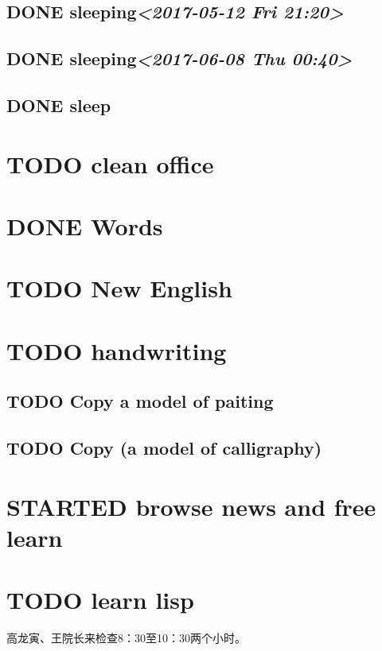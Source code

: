 \documentclass[cyan]{elegantnote}
\begin{document}
\section{{\bfseries\sffamily DONE} sleeping\textit{<2017-05-12 Fri 21:20>}}
\label{sec:org0e5e9d8}
\section{{\bfseries\sffamily DONE} sleeping\textit{<2017-06-08 Thu 00:40>}}
\label{sec:orgee92ec6}
\section{{\bfseries\sffamily DONE} sleep}
\label{sec:org1c503cd}

\chapter{{\bfseries\sffamily TODO} clean office}
\label{sec:org6c04039}
\chapter{{\bfseries\sffamily DONE} Words}
\label{sec:org1014f35}
\chapter{{\bfseries\sffamily TODO} New English}
\label{sec:org1eb3e82}

\chapter{{\bfseries\sffamily TODO} handwriting}
\label{sec:org2ade98b}
\section{{\bfseries\sffamily TODO} Copy a model of paiting}
\label{sec:org2b0575c}
\section{{\bfseries\sffamily TODO} Copy (a model of calligraphy)}
\label{sec:org6ac1b19}


\chapter{{\bfseries\sffamily STARTED} browse news and free learn}
\label{sec:org61343ea}
\chapter{{\bfseries\sffamily TODO} learn lisp}
\label{sec:org98c9ab7}
高龙寅、王院长来检查8：30至10：30两个小时。
\end{document}
